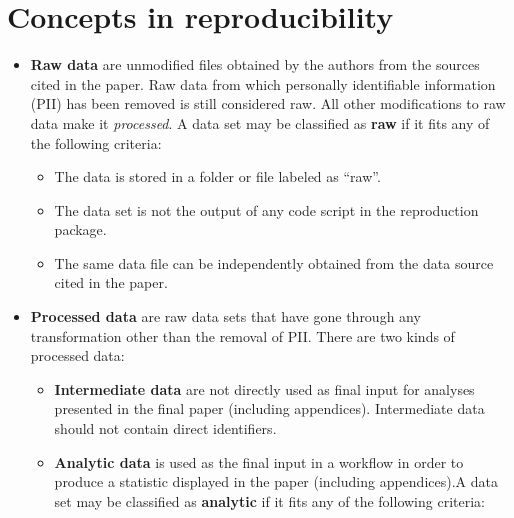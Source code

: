 \documentclass[]{book}
\providecommand{\tightlist}{%
  \setlength{\itemsep}{0pt}\setlength{\parskip}{0pt}}
\begin{document}
\hypertarget{concepts-in-reproducibility}{%
\section{Concepts in reproducibility}\label{concepts-in-reproducibility}}

\begin{itemize}
\item
  \textbf{Raw data} are unmodified files obtained by the authors from the sources cited in the paper. Raw data from which personally identifiable information (PII) has been removed is still considered raw. All other modifications to raw data make it \emph{processed}. A data set may be classified as \textbf{raw} if it fits any of the following criteria:

  \begin{itemize}
  \tightlist
  \item
    The data is stored in a folder or file labeled as ``raw''.\\
  \item
    The data set is not the output of any code script in the reproduction package.\\
  \item
    The same data file can be independently obtained from the data source cited in the paper.
  \end{itemize}
\item
  \textbf{Processed data} are raw data sets that have gone through any transformation other than the removal of PII. There are two kinds of processed data:

  \begin{itemize}
  \tightlist
  \item
    \textbf{Intermediate data} are not directly used as final input for analyses presented in the final paper (including appendices). Intermediate data should not contain direct identifiers.\\
  \item
    \textbf{Analytic data} is used as the final input in a workflow in order to produce a statistic displayed in the paper (including appendices).A data set may be classified as \textbf{analytic} if it fits any of the following criteria:


\end{itemize}
\end{itemize}
\end{document}
